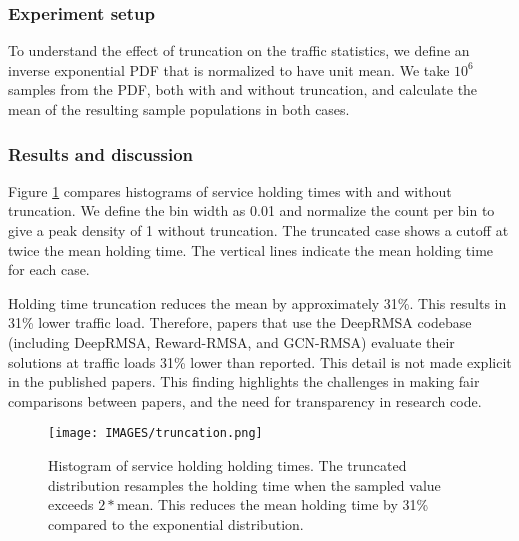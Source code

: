 \subsubsection{Experiment setup}
To understand the effect of truncation on the traffic statistics, we define an inverse exponential PDF that is normalized to have unit mean. We take $10^{6}$ samples from the PDF, both with and without truncation, and calculate the mean of the resulting sample populations in both cases.

\subsubsection{Results and discussion}
Figure \ref{fig:truncation} compares histograms of service holding times with and without truncation. We define the bin width as 0.01 and normalize the count per bin to give a peak density of 1 without truncation. The truncated case shows a cutoff at twice the mean holding time. The vertical lines indicate the mean holding time for each case.

Holding time truncation reduces the mean by approximately 31\%. This results in 31\% lower traffic load. Therefore, papers that use the DeepRMSA codebase (including DeepRMSA, Reward-RMSA, and GCN-RMSA) evaluate their solutions at traffic loads 31\% lower than reported. This detail is not made explicit in the published papers. This finding highlights the challenges in making fair comparisons between papers, and the need for transparency in research code.

\begin{figure}
    \centering
    \texttt{[image: IMAGES/truncation.png]}
    \caption{Histogram of service holding holding times. The truncated distribution resamples the holding time when the sampled value exceeds $2*$mean. This reduces the mean holding time by 31\% compared to the exponential distribution.}
    \label{fig:truncation}
\end{figure}


















